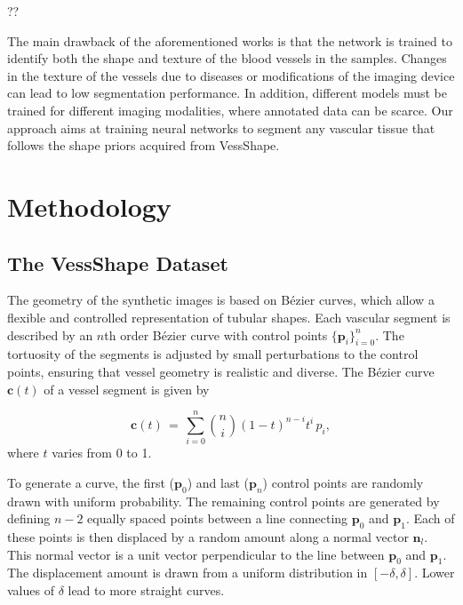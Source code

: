 \documentclass[%
reprint,
nofootinbib,
 amsmath,amssymb,
aps,
superscriptaddress,
showkeys,
longbibliography
]{revtex4-1}
\begin{document}
??

The main drawback of the aforementioned works is that the network is trained to identify both the shape and texture of the blood vessels in the samples. Changes in the texture of the vessels due to diseases or modifications of the imaging device can lead to low segmentation performance. In addition, different models must be trained for different imaging modalities, where annotated data can be scarce. Our approach aims at training neural networks to segment any vascular tissue that follows the shape priors acquired from VessShape.




\section{Methodology}
\label{s:methodology}

\subsection{The VessShape Dataset}

The geometry of the synthetic images is based on Bézier curves, which allow a flexible and controlled representation of tubular shapes. Each vascular segment is described by an $n$th order Bézier curve with control points $\{\mathbf{p}_i\}_{i=0}^n$. The tortuosity of the segments is adjusted by small perturbations to the control points, ensuring that vessel geometry is realistic and diverse. The Bézier curve $\mathbf{c}(t)$ of a vessel segment is given by

\begin{equation}
\mathbf{c}(t) \,=\, \sum_{i=0}^{n} \binom{n}{i} (1-t)^{n-i} t^{i} \, p_i,
\label{eq:bezier}
\end{equation}
where $t$ varies from 0 to 1. 

To generate a curve, the first ($\mathbf{p}_0$) and last ($\mathbf{p}_n$) control points are randomly drawn with uniform probability. The remaining control points are generated by defining $n-2$ equally spaced points between a line connecting $\mathbf{p}_0$ and $\mathbf{p}_1$. Each of these points is then displaced by a random amount along a normal vector $\mathbf{n}_l$. This normal vector is a unit vector perpendicular to the line between $\mathbf{p}_0$ and $\mathbf{p}_1$. The displacement amount is drawn from a uniform distribution in $[-\delta,\delta]$. Lower values of $\delta$ lead to more straight curves.
\end{document}
